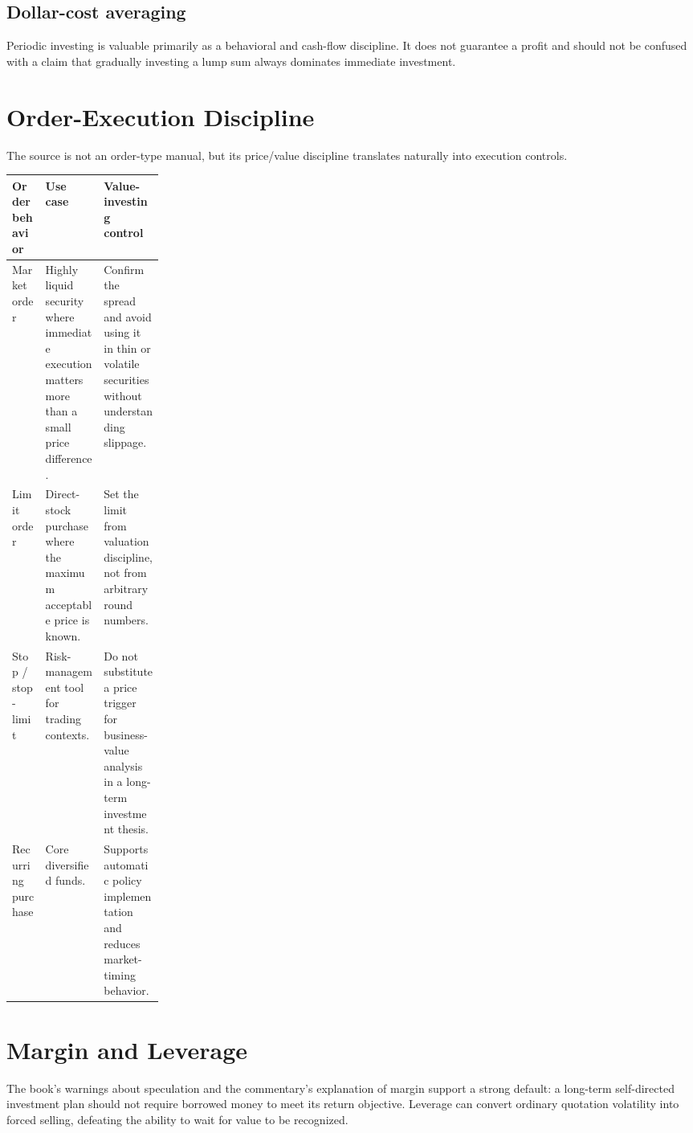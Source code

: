 \documentclass[11pt]{article}
\begin{document}
\subsection{Dollar-cost averaging}
Periodic investing is valuable primarily as a behavioral and cash-flow discipline. It does not guarantee a profit and should not be confused with a claim that gradually investing a lump sum always dominates immediate investment.

\section{Order-Execution Discipline}
The source is not an order-type manual, but its price/value discipline translates naturally into execution controls.
\begin{center}
\small
\begin{tabularx}{\linewidth}{@{}p{0.22\linewidth}Y Y@{}}
\toprule
\textbf{Order behavior} & \textbf{Use case} & \textbf{Value-investing control}\\
\midrule
Market order & Highly liquid security where immediate execution matters more than a small price difference. & Confirm the spread and avoid using it in thin or volatile securities without understanding slippage.\\
Limit order & Direct-stock purchase where the maximum acceptable price is known. & Set the limit from valuation discipline, not from arbitrary round numbers.\\
Stop / stop-limit & Risk-management tool for trading contexts. & Do not substitute a price trigger for business-value analysis in a long-term investment thesis.\\
Recurring purchase & Core diversified funds. & Supports automatic policy implementation and reduces market-timing behavior.\\
\bottomrule
\end{tabularx}
\end{center}

\section{Margin and Leverage}
The book's warnings about speculation and the commentary's explanation of margin support a strong default: a long-term self-directed investment plan should not require borrowed money to meet its return objective. Leverage can convert ordinary quotation volatility into forced selling, defeating the ability to wait for value to be recognized.
\end{document}

